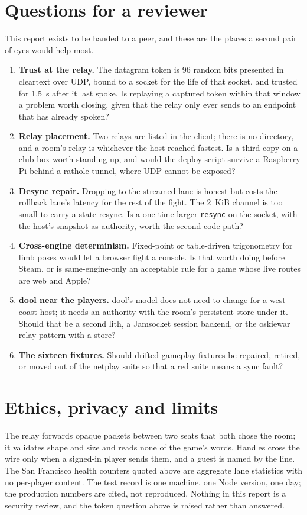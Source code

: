 \documentclass[10pt,letterpaper,twocolumn]{article}
\newcommand{\code}[1]{\texttt{\nolinkurl{#1}}}
\begin{document}
\section{Questions for a reviewer}\label{sec:questions}
This report exists to be handed to a peer, and these are the places a second pair of eyes would help most.
\begin{enumerate}
\item \textbf{Trust at the relay.} The datagram token is 96 random bits presented in cleartext over UDP, bound to a socket for the life of that socket, and trusted for 1.5~s after it last spoke. Is replaying a captured token within that window a problem worth closing, given that the relay only ever sends to an endpoint that has already spoken?
\item \textbf{Relay placement.} Two relays are listed in the client; there is no directory, and a room's relay is whichever the host reached fastest. Is a third copy on a club box worth standing up, and would the deploy script survive a Raspberry Pi behind a rathole tunnel, where UDP cannot be exposed?
\item \textbf{Desync repair.} Dropping to the streamed lane is honest but costs the rollback lane's latency for the rest of the fight. The 2~KiB channel is too small to carry a state resync. Is a one-time larger \code{resync} on the socket, with the host's snapshot as authority, worth the second code path?
\item \textbf{Cross-engine determinism.} Fixed-point or table-driven trigonometry for limb poses would let a browser fight a console. Is that worth doing before Steam, or is same-engine-only an acceptable rule for a game whose live routes are web and Apple?
\item \textbf{dool near the players.} dool's model does not need to change for a west-coast host; it needs an authority with the room's persistent store under it. Should that be a second lith, a Jamsocket session backend, or the oskiewar relay pattern with a store?
\item \textbf{The sixteen fixtures.} Should drifted gameplay fixtures be repaired, retired, or moved out of the netplay suite so that a red suite means a sync fault?
\end{enumerate}

\section{Ethics, privacy and limits}\label{sec:limits}
The relay forwards opaque packets between two seats that both chose the room; it validates shape and size and reads none of the game's words. Handles cross the wire only when a signed-in player sends them, and a guest is named by the line. The San Francisco health counters quoted above are aggregate lane statistics with no per-player content. The test record is one machine, one Node version, one day; the production numbers are cited, not reproduced. Nothing in this report is a security review, and the token question above is raised rather than answered.
\end{document}

